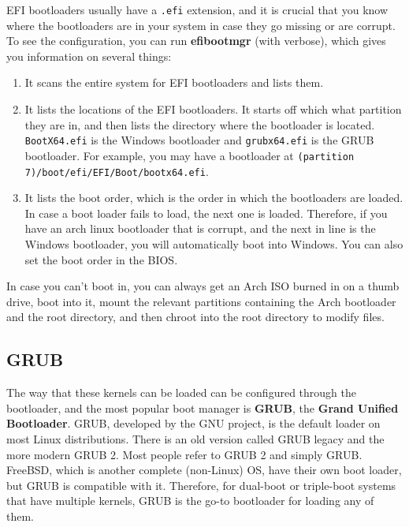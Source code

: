 \documentclass{article}
\begin{document}
  EFI bootloaders usually have a \texttt{.efi} extension, and it is crucial that you know where the bootloaders are in your system in case they go missing or are corrupt. To see the configuration, you can run \textbf{efibootmgr} (with verbose), which gives you information on several things: 
  \begin{enumerate} 
    \item It scans the entire system for EFI bootloaders and lists them. 
    \item It lists the locations of the EFI bootloaders. It starts off which what partition they are in, and then lists the directory where the bootloader is located. \texttt{BootX64.efi} is the Windows bootloader and \texttt{grubx64.efi} is the GRUB bootloader. For example, you may have a bootloader at \texttt{(partition 7)/boot/efi/EFI/Boot/bootx64.efi}. 
    \item It lists the boot order, which is the order in which the bootloaders are loaded. In case a boot loader fails to load, the next one is loaded. Therefore, if you have an arch linux bootloader that is corrupt, and the next in line is the Windows bootloader, you will automatically boot into Windows. You can also set the boot order in the BIOS. 
  \end{enumerate}

  In case you can't boot in, you can always get an Arch ISO burned in on a thumb drive, boot into it, mount the relevant partitions containing the Arch bootloader and the root directory, and then chroot into the root directory to modify files. 

  \subsection{GRUB}

    The way that these kernels can be loaded can be configured through the bootloader, and the most popular boot manager is \textbf{GRUB}, the \textbf{Grand Unified Bootloader}. GRUB, developed by the GNU project, is the default loader on most Linux distributions. There is an old version called GRUB legacy and the more modern GRUB 2. Most people refer to GRUB 2 and simply GRUB. FreeBSD, which is another complete (non-Linux) OS, have their own boot loader, but GRUB is compatible with it. Therefore, for dual-boot or triple-boot systems that have multiple kernels, GRUB is the go-to bootloader for loading any of them. 
\end{document}
